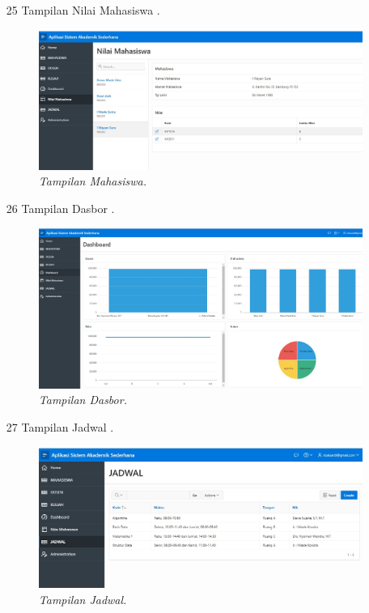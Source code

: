\begin{enumerate}
\item[25]Tampilan Nilai Mahasiswa .
\begin{figure}[!htbp]
    \begin{center}
    \includegraphics[scale=0.3]{figures/nilaimhs.jpg}
    \caption{\textit{Tampilan Mahasiswa.}}
    \end{center}
\end{figure}
\par

\item[26]Tampilan Dasbor .
\begin{figure}[!htbp]
    \begin{center}
    \includegraphics[scale=0.2]{figures/dasbor.jpg}
    \caption{\textit{Tampilan Dasbor.}}
    \end{center}
\end{figure}
\par

\item[27]Tampilan Jadwal .
\begin{figure}[!htbp]
    \begin{center}
    \includegraphics[scale=0.3]{figures/jadwal.jpg}
    \caption{\textit{Tampilan Jadwal.}}
    \end{center}
\end{figure}
\par
\end{enumerate}
